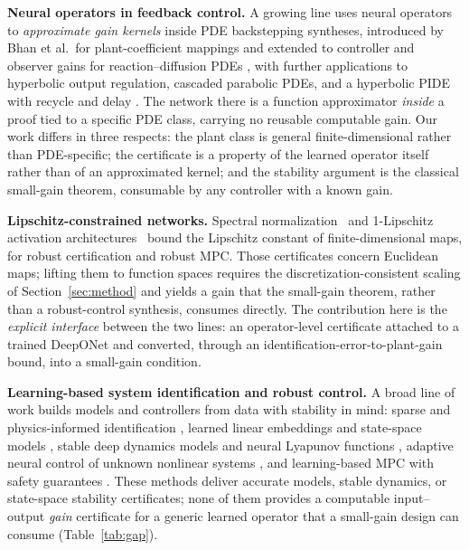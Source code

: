 \documentclass[11pt]{article}
\begin{document}
\textbf{Neural operators in feedback control.} A growing line uses neural
operators to \emph{approximate gain kernels} inside PDE backstepping
syntheses, introduced by Bhan et al.\ for plant-coefficient mappings and
extended to controller and observer gains for reaction--diffusion PDEs
\citep{bhan2024bypassing,krstic2024observer}, with further applications to hyperbolic
output regulation, cascaded parabolic PDEs, and a hyperbolic PIDE with recycle
and delay \citep{xiao2024output,lv2025cascaded,qi2024pide}.
The network there is a function approximator \emph{inside} a proof tied to a
specific PDE class, carrying no reusable computable gain. Our work differs in
three respects: the plant class is general finite-dimensional rather than
PDE-specific; the certificate is a property of the learned operator itself
rather than of an approximated kernel; and the stability argument is the
classical small-gain theorem, consumable by any controller with a known gain.

\textbf{Lipschitz-constrained networks.} Spectral
normalization~\citep{miyato2018spectral} and 1-Lipschitz activation
architectures~\citep{pauli2021lipschitz} bound the Lipschitz constant of
finite-dimensional maps, for robust certification and robust MPC. Those
certificates concern Euclidean maps; lifting them to function spaces requires
the discretization-consistent scaling of Section~\ref{sec:method} and yields a
gain that the small-gain theorem, rather than a robust-control synthesis,
consumes directly. The contribution here is the \emph{explicit interface} between the two lines:
an operator-level certificate attached to a trained DeepONet and converted,
through an identification-error-to-plant-gain bound, into a small-gain
condition.

\textbf{Learning-based system identification and robust control.} A broad
line of work builds models and controllers from data with stability in mind: sparse and physics-informed identification
\citep{brunton2016sindy,raissi2019pinn}, learned linear embeddings and
state-space models \citep{lusch2018deep,masti2021learning}, stable deep
dynamics models and neural Lyapunov functions
\citep{kolter2019learning,chang2019neural}, adaptive neural control of
unknown nonlinear systems \citep{liang2024learning,zheng2024adaptive},
and learning-based MPC with
safety guarantees \citep{hewing2020learning}. These methods deliver accurate
models, stable dynamics, or state-space stability certificates; none of
them provides a computable input--output \emph{gain} certificate for a
generic learned operator that a small-gain design can consume
(Table~\ref{tab:gap}).
\end{document}

